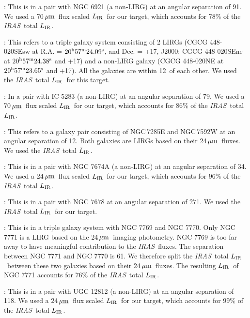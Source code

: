 \documentclass[preprint]{aastex}
\newcommand{\um}{\mbox{$\,\mu{\rm m}$}}
\newcommand{\IRAS}{{\it IRAS}}
\newcommand{\LIR}{\mbox{$L_{\rm IR}$}}
\begin{document}
: This is in a pair with NGC 6921 (a non-LIRG) at an angular separation of 91\arcsec. We used 
	    a 70\um\ flux scaled \LIR\ for our target, which accounts for 78\% of the \IRAS\ total \LIR.

: This refers to a triple galaxy system consisting of 2 LIRGs (CGCG 448-020SEsw at R.A. 
	    = $20^{\rm h}57^{\rm m}24.09^{\rm s}$, and Dec. = +17\arcsec, J2000; CGCG 448-020SEne  at 
	    $20^{\rm h}57^{\rm m}24.38^{\rm s}$ and +17\arcsec) and a non-LIRG galaxy
	    (CGCG 448-020NE at $20^{\rm h}57^{\rm m}23.65^{\rm s}$ and +17\arcsec). 
            All the galaxies are within 12\arcsec\ of each other. We used 
	    the \IRAS\ total \LIR\ for this target.

: In a pair with IC 5283 (a non-LIRG) at an angular separation of 79\arcsec. We used a 70\um\ flux scaled 
	    \LIR\ for our target,  which accounts for 86\% of the \IRAS\ total \LIR.

: This refers to a galaxy pair consisting of NGC\,7285E and NGC\,7592W at an angular separation of 
	    12\arcsec. Both galaxies are LIRGs based on their 24\um\ fluxes. We used the \IRAS\ total \LIR.

: This is in a pair with NGC 7674A (a non-LIRG) at an angular separation of 34\arcsec. We used a 
	    24\um\ flux scaled \LIR\ for our target, which accounts for 96\% of the \IRAS\ total \LIR.

: This is in a pair with NGC 7678 at an angular separation of 271\arcsec.  We used the \IRAS\ total 
	     \LIR\ for our target.

: This is in a triple galaxy system with NGC 7769 and NGC 7770. Only NGC 7771 is a LIRG based on 
	    the 24\um\ imaging photometry.  NGC 7769 is too far away to have meaningful contribution to the \IRAS\ fluxes.  
	    The separation between NGC 7771 and NGC 7770 is 61\arcsec.  We therefore split the \IRAS\ total \LIR\ between 
          these two galaxies based on their 24\um\ fluxes.  The resulting \LIR\ of NGC 7771 accounts for 76\% of the \IRAS\ 
          total \LIR.

: This is in a pair with UGC 12812 (a non-LIRG) at an angular separation of 118\arcsec.  We used 
          a 24\um\ flux scaled \LIR\ for our target, which accounts for 99\% of the \IRAS\ total \LIR.
\end{document}
